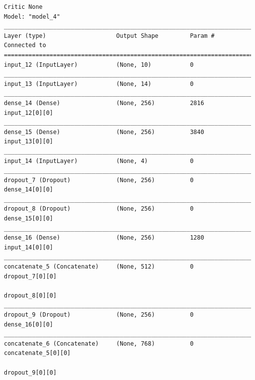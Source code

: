 \documentclass[man, 12pt]{apa6}
\begin{document}
\begin{verbatim}
Critic None
Model: "model_4"
__________________________________________________________________________________________________
Layer (type)                    Output Shape         Param #     Connected to                     
==================================================================================================
input_12 (InputLayer)           (None, 10)           0                                            
__________________________________________________________________________________________________
input_13 (InputLayer)           (None, 14)           0                                            
__________________________________________________________________________________________________
dense_14 (Dense)                (None, 256)          2816        input_12[0][0]                   
__________________________________________________________________________________________________
dense_15 (Dense)                (None, 256)          3840        input_13[0][0]                   
__________________________________________________________________________________________________
input_14 (InputLayer)           (None, 4)            0                                            
__________________________________________________________________________________________________
dropout_7 (Dropout)             (None, 256)          0           dense_14[0][0]                   
__________________________________________________________________________________________________
dropout_8 (Dropout)             (None, 256)          0           dense_15[0][0]                   
__________________________________________________________________________________________________
dense_16 (Dense)                (None, 256)          1280        input_14[0][0]                   
__________________________________________________________________________________________________
concatenate_5 (Concatenate)     (None, 512)          0           dropout_7[0][0]                  
                                                                 dropout_8[0][0]                  
__________________________________________________________________________________________________
dropout_9 (Dropout)             (None, 256)          0           dense_16[0][0]                   
__________________________________________________________________________________________________
concatenate_6 (Concatenate)     (None, 768)          0           concatenate_5[0][0]              
                                                                 dropout_9[0][0]                  

\end{verbatim}
\end{document}
